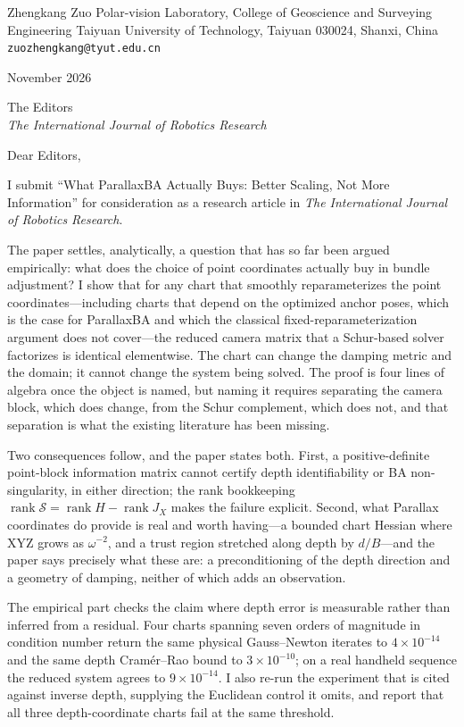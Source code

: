 \documentclass[10pt,a4paper]{article}
\DeclareMathOperator{\rank}{rank}
\begin{document}
\noindent
Zhengkang Zuo\newline
Polar-vision Laboratory, College of Geoscience and Surveying Engineering\newline
Taiyuan University of Technology, Taiyuan 030024, Shanxi, China\newline
\texttt{zuozhengkang@tyut.edu.cn}

\bigskip
{} November 2026

\bigskip
\noindent
The Editors\\
\textit{The International Journal of Robotics Research}

\bigskip
\noindent Dear Editors,

I submit ``What ParallaxBA Actually Buys: Better Scaling, Not More Information'' for consideration as a research article in \textit{The International Journal of Robotics Research}.

The paper settles, analytically, a question that has so far been argued empirically: what does the choice of point coordinates actually buy in bundle adjustment? I show that for any chart that smoothly reparameterizes the point coordinates---including charts that depend on the optimized anchor poses, which is the case for ParallaxBA and which the classical fixed-reparameterization argument does not cover---the reduced camera matrix that a Schur-based solver factorizes is identical elementwise. The chart can change the damping metric and the domain; it cannot change the system being solved. The proof is four lines of algebra once the object is named, but naming it requires separating the camera block, which does change, from the Schur complement, which does not, and that separation is what the existing literature has been missing.

Two consequences follow, and the paper states both. First, a positive-definite point-block information matrix cannot certify depth identifiability or BA non-singularity, in either direction; the rank bookkeeping $\rank\mathcal S=\rank H-\rank J_X$ makes the failure explicit. Second, what Parallax coordinates do provide is real and worth having---a bounded chart Hessian where XYZ grows as $\omega^{-2}$, and a trust region stretched along depth by $d/B$---and the paper says precisely what these are: a preconditioning of the depth direction and a geometry of damping, neither of which adds an observation.

The empirical part checks the claim where depth error is measurable rather than inferred from a residual. Four charts spanning seven orders of magnitude in condition number return the same physical Gauss--Newton iterates to $4\times10^{-14}$ and the same depth Cram\'er--Rao bound to $3\times10^{-10}$; on a real handheld sequence the reduced system agrees to $9\times10^{-14}$. I also re-run the experiment that is cited against inverse depth, supplying the Euclidean control it omits, and report that all three depth-coordinate charts fail at the same threshold.
\end{document}
